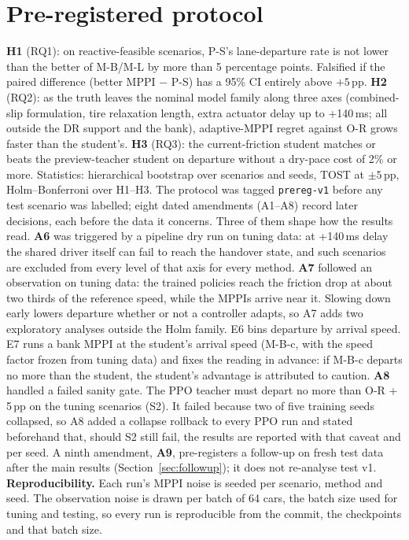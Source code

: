 \documentclass[11pt]{article}
\begin{document}
\section{Pre-registered protocol}\label{sec:protocol}
\textbf{H1} (RQ1): on reactive-feasible scenarios, P-S's lane-departure rate is not lower than the better of M-B/M-L
by more than 5 percentage points. Falsified if the paired difference (better MPPI $-$ P-S) has a 95\% CI entirely
above $+5$\,pp. \textbf{H2} (RQ2): as the truth leaves the nominal model family along three axes (combined-slip
formulation, tire relaxation length, extra actuator delay up to +140\,ms; all outside the DR support and the bank),
adaptive-MPPI regret against O-R grows faster than the student's. \textbf{H3} (RQ3): the current-friction student
matches or beats the preview-teacher student on departure without a dry-pace cost of 2\% or more.
Statistics: hierarchical bootstrap over scenarios and seeds, TOST at $\pm5$\,pp, Holm--Bonferroni over H1--H3.
The protocol was tagged \texttt{prereg-v1} before any test scenario was labelled; eight dated amendments (A1--A8)
record later decisions, each before the data it concerns. Three of them shape how the results read.
\textbf{A6} was triggered by a pipeline dry run on tuning data: at +140\,ms delay the shared driver itself can fail
to reach the handover state, and such scenarios are excluded from every level of that axis for every method.
\textbf{A7} followed an observation on tuning data: the trained policies reach the friction drop at about two
thirds of the reference speed, while the MPPIs arrive near it. Slowing down early lowers departure whether or not a
controller adapts, so A7 adds two exploratory analyses outside the Holm family. E6 bins departure by arrival speed.
E7 runs a bank MPPI at the student's arrival speed (M-B-c, with the speed factor frozen from tuning data) and fixes
the reading in advance: if M-B-c departs no more than the student, the student's advantage is attributed to caution.
\textbf{A8} handled a failed sanity gate. The PPO teacher must depart no more than O-R + 5\,pp on the tuning
scenarios (S2). It failed because two of five training seeds collapsed, so A8 added a collapse rollback to every
PPO run and stated beforehand that, should S2 still fail, the results are reported with that caveat and per seed.
A ninth amendment, \textbf{A9}, pre-registers a follow-up on fresh test data after the main results
(Section~\ref{sec:followup}); it does not re-analyse test v1.
\textbf{Reproducibility.} Each run's MPPI noise is seeded per scenario, method and seed. The observation noise is
drawn per batch of 64 cars, the batch size used for tuning and testing, so every run is reproducible from the
commit, the checkpoints and that batch size.
\end{document}
